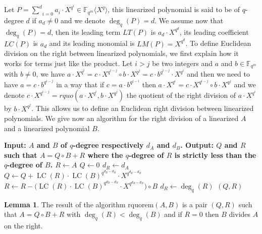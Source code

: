 \documentclass{article}
\newcommand{\tmop}[1]{#1}          %
\theoremstyle{definition}
\newtheorem{lemma}[theorem]{Lemma}
\begin{document}
\noindent Let $P = \underset{i = 0}{\overset{d}{\sum}} a_i \cdot X^{q^i} \in
      \mathbb{F}_{q^m} \langle X^q \rangle$, this linearized polynomial is said to
be of $q$-degree $d$ if $a_d \neq 0$ and we denote $\deg_q(P) = d$. We
assume now that $\deg_q(P) = d$, then its leading term $\tmop{LT} (P)$
is $a_d \cdot X^{q^d}$, its leading coefficient $\tmop{LC} (P)$ is $a_d$ and
its leading monomial is $\tmop{LM} (P) = X^{q^d}$. To define Euclidean
division on the right between linearized polynomials, we first explain how it
works for terms just like the product. Let $i > j$ be two integers and $a$ and
$b \in \mathbb{F}_{q^m}$ with $b \neq 0$, we have $a \cdot X^{q^i} = c \cdot
      X^{q^{i - j}} \circ b \cdot X^{q^j} = c \cdot b^{q^{i - j}} \cdot X^{q^i}$ and
then we need to have $a = c \cdot b^{q^{i - j}}$ in a way that if $c = a \cdot
      b^{q^{j - i}}$ then $a \cdot X^{q^i} = c \cdot X^{q^{i - j}} \circ b \cdot
      X^{q^j}$ and we denote $c \cdot X^{q^{i - j}} = \tmop{rquo} (a \cdot X^{q^i},
      b \cdot X^{q^j})$ the quotient of the right division of $a \cdot X^{q^i}$ by
$b \cdot X^{q^j}$. This allows us to define an Euclidean right division
between linearized polynomials. We give now an algorithm for the right division
of a linearized $A$ and a linearized polynomial $B$.

\begin{algorithm}
      \caption{Algorithm for $q$-polynomial right  division (RQUOREM)}
      \label{rqorem}
      \begin{algorithmic}[1]
            \STATE \bf{Input:} $A$ and $B$ of $q$-degree respectively $d_A$ and $d_B$.
            \STATE \bf{Output:} $Q$ and $R$ such that $A = Q \circ B + R$ where the $q$-degree of $R$ is strictly less than the $q$-degree of $B$.
            \STATE $R \gets A$
            \STATE $Q \gets 0$
            \STATE $d_R \gets d_A$
            \STATE $Q \gets Q + \operatorname{LC}(R) \cdot \operatorname{LC}(B)^{q^{d_B - d_R}} \cdot X^{q^{d_R - d_B}}$
            \STATE $R \gets R - \bigl( \operatorname{LC}(R) \cdot \operatorname{LC}(B)^{q^{d_B - d_R}} \cdot X^{q^{d_R - d_B}} \bigr) \circ B$
            \STATE $d_R \gets \deg_q(R)$
            \ENDWHILE
            \RETURN $(Q,R)$
      \end{algorithmic}
\end{algorithm}

\begin{lemma}
      The result of the algorithm $\text{rquorem} (A, B)$ is a pair $(Q, R)$ such
      that $A = Q \circ B + R$ with $\deg_q(R)< \deg_q(B)$ and if
      $R = 0$ then $B$ divides $A$ on the right.
\end{lemma}
\end{document}
